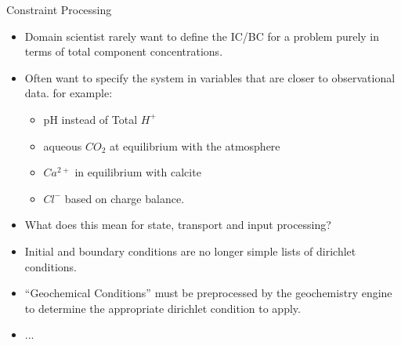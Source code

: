 \documentclass{beamer}
\begin{document}
\begin{frame}{Constraint Processing}
\begin{itemize}
\item Domain scientist rarely want to define the IC/BC for a problem
  purely in terms of total component concentrations.
\item Often want to specify the system in variables that are
  closer to observational data. for example:
  \begin{itemize}
    \item pH instead of Total $H^+$
    \item aqueous $CO_2$ at equilibrium with the atmosphere
    \item $Ca^{2+}$ in equilibrium with calcite
    \item $Cl^-$ based on charge balance.
  \end{itemize}
\item What does this mean for state, transport and input processing?
\item Initial and boundary conditions are no longer simple lists of
  dirichlet conditions.
\item ``Geochemical Conditions'' must be preprocessed by the
  geochemistry engine to determine the appropriate dirichlet condition
  to apply.
\item ...
\end{itemize}
\end{frame}
\end{document}
